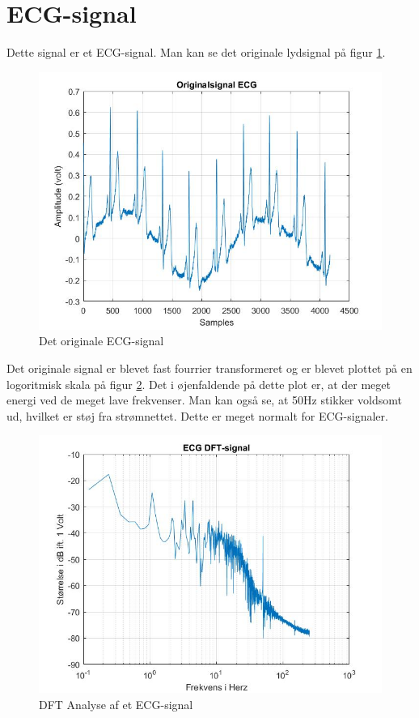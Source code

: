 \section{ECG-signal}
Dette signal er et ECG-signal. Man kan se det originale lydsignal på figur \ref{fig:ECG original}.
\begin{figure}[H]
	\centering
	\includegraphics[width=140mm]{figures/ECG/original.jpg}
	\caption{Det originale ECG-signal}
	\label{fig:ECG original}
\end{figure}

Det originale signal er blevet fast fourrier transformeret og er blevet plottet på en logoritmisk skala på figur \ref{fig:ECG DFT}. Det i øjenfaldende på dette plot er, at der meget energi ved de meget lave frekvenser. Man kan også se, at 50Hz stikker voldsomt ud, hvilket er støj fra strømnettet. Dette er meget normalt for ECG-signaler.
\begin{figure}[H]
	\centering
	\includegraphics[width=140mm]{figures/ECG/DFT.jpg}
	\caption{DFT Analyse af et ECG-signal}
	\label{fig:ECG DFT}
\end{figure}

